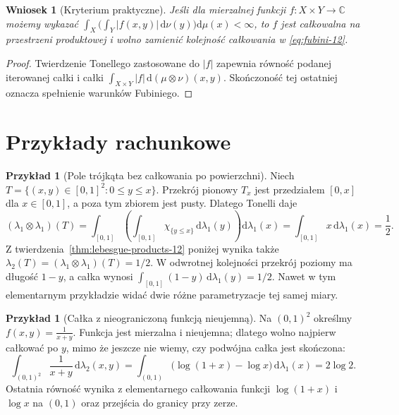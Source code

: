 \documentclass[11pt,a4paper,oneside]{book}
\numberwithin{equation}{chapter}
\theoremstyle{plain}
\newtheorem{wniosek}[twierdzenie]{Wniosek}
\theoremstyle{definition}
\newtheorem{przyklad}[twierdzenie]{Przykład}
\theoremstyle{remark}
\begin{document}
\begin{wniosek}[Kryterium praktyczne]
\label{cor:practical-fubini-12}
Jeśli dla mierzalnej funkcji $f:X\times Y\to\mathbb C$
możemy wykazać
$\int_X\bigl(\int_Y |f(x,y)|\,\mathrm d\nu(y)\bigr)
\mathrm d\mu(x)<\infty$, to $f$ jest całkowalna
na przestrzeni produktowej i wolno zamienić kolejność
całkowania w \eqref{eq:fubini-12}.
\end{wniosek}
\begin{proof}
Twierdzenie Tonellego zastosowane do $|f|$ zapewnia
równość podanej iterowanej całki i całki
$\int_{X\times Y}|f|\,\mathrm d(\mu\otimes\nu)(x,y)$.
Skończoność tej ostatniej oznacza spełnienie
warunków Fubiniego.
\end{proof}

\section{Przykłady rachunkowe}

\begin{przyklad}[Pole trójkąta bez całkowania po powierzchni]
Niech $T=\{(x,y)\in[0,1]^2:0\le y\le x\}$.
Przekrój pionowy $T_x$ jest przedziałem $[0,x]$
dla $x\in[0,1]$, a poza tym zbiorem jest pusty.
Dlatego Tonelli daje
\[
(\lambda_1\otimes\lambda_1)(T)=\int_{[0,1]}\left(
\int_{[0,1]}\chi_{\{y\le x\}}\,\mathrm d\lambda_1(y)
\right)\mathrm d\lambda_1(x)
=\int_{[0,1]}x\,\mathrm d\lambda_1(x)=\frac12.
\]
Z twierdzenia~\ref{thm:lebesgue-products-12} poniżej wynika także
$\lambda_2(T)=(\lambda_1\otimes\lambda_1)(T)=1/2$.
W odwrotnej kolejności przekrój poziomy ma długość
$1-y$, a całka wynosi
$\int_{[0,1]}(1-y)\,\mathrm d\lambda_1(y)=1/2$.
Nawet w tym elementarnym przykładzie widać dwie
różne parametryzacje tej samej miary.
\end{przyklad}

\begin{przyklad}[Całka z nieograniczoną funkcją nieujemną]
Na $(0,1)^2$ określmy $f(x,y)=\frac{1}{x+y}$.
Funkcja jest mierzalna i nieujemna; dlatego wolno
najpierw całkować po $y$, mimo że jeszcze nie
wiemy, czy podwójna całka jest skończona:
\[
\int_{(0,1)^2}\frac{1}{x+y}\,\mathrm d\lambda_2(x,y)
=\int_{(0,1)}\bigl(\log(1+x)-\log x\bigr)
\,\mathrm d\lambda_1(x)=2\log2.
\]
Ostatnia równość wynika z elementarnego
całkowania funkcji $\log(1+x)$ i $\log x$
na $(0,1)$ oraz przejścia do granicy przy zerze.
\end{przyklad}
\end{document}
